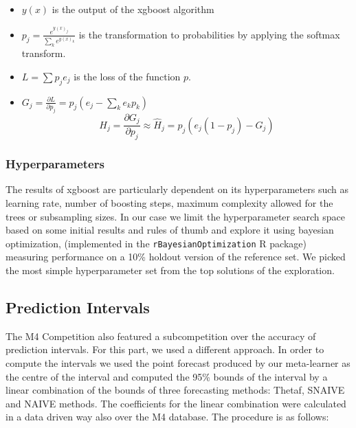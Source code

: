 \documentclass[11pt,a4paper,]{article}
\providecommand{\tightlist}{%
  \setlength{\itemsep}{0pt}\setlength{\parskip}{0pt}}
\theoremstyle{definition}
\theoremstyle{definition}
\theoremstyle{definition}
\theoremstyle{remark}
\begin{document}
\begin{itemize}
\tightlist
\item
  \(y(x)\) is the output of the xgboost algorithm
\item
  \(p_j = \frac{e^{y(x)_j}}{ \sum_k e^{y(x)_k}}\) is the transformation
  to probabilities by applying the softmax transform.
\item
  \(L = \sum p_j e_j\) is the loss of the function \(p\).
\item
  \(G_j = \frac{\partial{L}}{\partial{p_j}} = p_j(e_j -\sum_k e_kp_k)\)
  \[ H_j = \frac{\partial{G_j}}{\partial{p_j}} \approx \hat{H}_j = p_j(e_j(1-p_j) - G_j)  \]
\end{itemize}

\subsubsection{Hyperparameters}\label{hyperparameters}

The results of xgboost are particularly dependent on its hyperparameters
such as learning rate, number of boosting steps, maximum complexity
allowed for the trees or subsampling sizes. In our case we limit the
hyperparameter search space based on some initial results and rules of
thumb and explore it using bayesian optimization, (implemented in the
\texttt{rBayesianOptimization} R
package\autocite{rBayesianOptimization}) measuring performance on a 10\%
holdout version of the reference set. We picked the most simple
hyperparameter set from the top solutions of the exploration.

\subsection{Prediction Intervals}\label{prediction-intervals}

The M4 Competition also featured a subcompetition over the accuracy of
prediction intervals. For this part, we used a different approach. In
order to compute the intervals we used the point forecast produced by
our meta-learner as the centre of the interval and computed the 95\%
bounds of the interval by a linear combination of the bounds of three
forecasting methods: Thetaf, SNAIVE and NAIVE methods. The coefficients
for the linear combination were calculated in a data driven way also
over the M4 database. The procedure is as follows:
\end{document}
